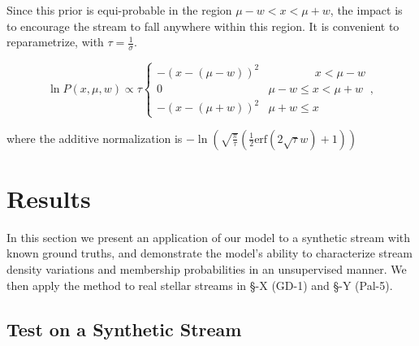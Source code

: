 \documentclass[twocolumn]{aastex631}
\newcommand{\mrm}[1]{\mathrm{#1}}
\newcommand{\mbs}[1]{\boldsymbol{#1}}
\newcommand{\mcal}[1]{\mathcal{#1}}
\newcommand{\nth}[1]{{#1}_{\mrm{n}}}
\newcommand{\pdf}{P}
\begin{document}
            Since this prior is equi-probable in the region $\mu - w < x < \mu + w$, the  impact is to encourage the stream to fall anywhere within this region. 
            It is convenient to reparametrize, with $\tau = \frac{1}{\sigma}$.
            \begin{small}
            \begin{equation}
                \ln \pdf(x,\mu,w) \propto \tau \begin{cases} 
                    -\left(x-(\mu-w)\right)^2 & \phantom{\mu - w <}\ x < \mu - w \\
                    0 & \mu - w \leq x < \mu + w \\
                    -\left(x-(\mu+w)\right)^2 & \mu + w \leq x
                \end{cases},
            \end{equation}\end{small}
            where the additive normalization is 
            $-\ln\left(\sqrt{\frac{\pi}{\tau}} \left(\frac{1}{2}\text{erf}\left(2 \sqrt{\tau } w\right)+1\right)\right)$
    
    
    

        

\section{Results} \label{sec:results}

    In this section we present an application of our model to a synthetic stream with known ground truths, and demonstrate the model's ability to characterize stream density variations and membership probabilities in an unsupervised manner. We then apply the method to real stellar streams in \S-X (GD-1) and \S-Y (Pal-5).

    \subsection{Test on a Synthetic Stream}\label{sub:simple_mock_data}
    
\end{document}
